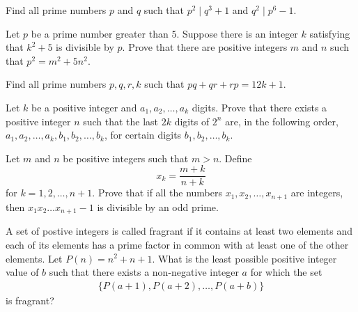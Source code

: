 \begin{problem}
	Find all prime numbers $p$ and $q$ such that $p^2\mid q^3+1$ and $q^2\mid p^6-1$. %
\end{problem}

\begin{problem}
	Let $p$ be a prime number greater than $5$. Suppose there is an integer $k$ satisfying that $k^2+5$ is divisible by $p$. Prove that there are positive integers $m$ and $n$ such that $p^2=m^2+5n^2$. %
\end{problem}

\begin{problem}[IberoAmerican 2016]
	Find all prime numbers $p,q,r,k$ such that $pq+qr+rp = 12k+1$. %
\end{problem}

\begin{problem}[IberoAmerican 2016]
	Let $k$ be a positive integer and $a_1, a_2,\dots, a_k$ digits. Prove that there exists a positive integer $n$ such that the last $2k$ digits of $2^n$ are, in the following order, $a_1, a_2,\dots, a_k , b_1, b_2, \dots, b_k$, for certain digits $b_1, b_2, \dots, b_k$. %
\end{problem}

\begin{problem}
	Let $m$ and $n$ be positive integers such that $m>n$. Define $$x_k=\frac{m+k}{n+k}$$ for $k=1,2,\ldots,n+1$. Prove that if all the numbers $x_1,x_2,\ldots,x_{n+1}$ are integers, then $x_1x_2\ldots x_{n+1}-1$ is divisible by an odd prime. %
\end{problem}

\begin{problem}[IMO 2016]
	A set of postive integers is called fragrant if it contains at least two elements and each of its elements has a prime factor in common with at least one of the other elements. Let $P(n)=n^2+n+1$. What is the least possible positive integer value of $b$ such that there exists a non-negative integer $a$ for which the set
		\begin{align*}
			\{P(a+1),P(a+2),\ldots,P(a+b)\}
		\end{align*}
	is fragrant? %
\end{problem}

